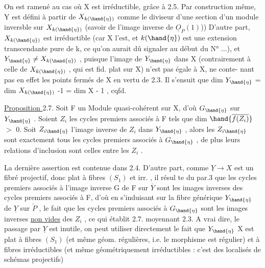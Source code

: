 
On est ramené au cas où X est irréductible, grâce à 2.5. Par construction
même, Y est défini à partir de $X_{k(\hand{\eta})}$ comme le diviseur d'une section
d'un module inversble sur $X_{k(\hand{\eta})}$ (savoir de l'image inverse de $\underline{O}_P(1)$))
D'autre part, $X_{k(\hand{\eta})}$ est irréductible (car X l'est, et $k(\hand{\eta})$ est une
\placedmargin{|} extension transcendante pure de k, ce qu'on aurait dû signaler au début du
N° ...), et $Y_{\hand{\eta}} \neq X_{k(\hand{\eta})}$ , puisque l'image de $Y_{\hand{\eta}}$ dans X (contrairement
à celle de $X_{k(\hand{\eta})}$ , qui est fid. plat sur X) n'est pas égale à X, ne conte-%
nant pas en effet les points fermés de X en vertu de 2.3. Il s'ensuit que
dim $Y_{\hand{\eta}}$ = dim $X_{k(\hand{\eta})}$ -1  = dim X - 1 , cqfd.

\uline{Proposition }2.7. Soit F un Module quasi-cohérent sur X, d'où $G_{\hand{\eta}}$ sur $Y_{\hand{\eta}}$ .
Soient $Z_i$ les cycles premiers associés à F tels que dim $\hand{\overline{f(Z_i)}}$ $>$ 0. Soit
$Z_{i\hand{\eta}}$ l'image inverse de $Z_i$ dans $Y_{\hand{\eta}}$ , alors les $Z_{i\hand{\eta}}$ sont exactement tous
les cycles premiers associés à $G_{\hand{\eta}}$ , de plus leurs relations d'inclusion
sont celles entre les $Z_i$ .

La dernière assertion est contenue dans 2.4. D'autre part, comme
$\underline{Y} \rightarrow X$ est un fibré projectif, donc plat à fibres $(S_1)$ et irr. , il résul
te du par.3 que les cycles premiers associés à l'image inverse G de F sur
$\overline{Y}$ sont les images inverses  des cycles premiers associés à F,
d'où en  s'induisant sur la fibre générique $Y_{\hand{\eta}}$ de $\underline{Y}$ sur $\check{P}$ , le fait que les
cycles premiers associés à $G_{\hand{\eta}}$ sont les images inverses \uline{non vides} des $Z_i$ ,
ce qui établit 2.7. moyennant 2.3. A vrai dire, le passage par $\underline{Y}$ est
inutile, on peut utiliser directement le fait que $Y_{\hand{\eta}}$ \hand{$\longrightarrow$} X est plat à
fibres $(S_1)$ (et même géom. régulières, i.e. le morphisme est régulier)
et à fibres irréductibles (et même géométriquement irréductibles : c'est
des localisés de schémas projectifs)\hand{;} 


